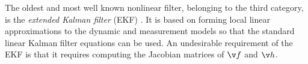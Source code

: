 The oldest and most well known nonlinear filter, belonging to the third category, is
the \emph{extended Kalman filter} (EKF) \parencite{jazwinski1970stochastic}. 
It is based on forming local linear approximations to the dynamic
and measurement models so that the standard linear Kalman filter equations can be used.
An undesirable requirement of the EKF is that it requires computing
the Jacobian matrices of $\f$ and $\h$.

